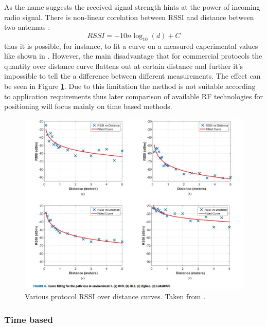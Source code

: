 As the name suggests the received signal strength hints at the power of incoming radio signal. There is non-linear corelation between RSSI and distance between two antennas \cite{rssi-curves}:
$$
R S S I=-10 n \log _{10}(d)+C
$$
thus it is possible, for instance, to fit a curve on a measured experimental values like shown in \cite{rssi-curves}. However, the main disadvantage that for commercial protocols the quantity over distance curve flattens out at certain distance and further it's impossible to tell the a difference between different measurements. The effect can be seen in Figure \ref{fig:rssi-curves}. Due to this limitation the method is not suitable according to application requirements thus later comparison of available RF technologies for positioning will focus mainly on time based methods.
\begin{figure}
    \includegraphics[width=\linewidth]{figures/RSSICurves.jpg}
    \caption{Various protocol RSSI over distance curves. Taken from \cite{rssi-curves}.}
    \label{fig:rssi-curves}
\end{figure}
  
\subsubsection{Time based}


